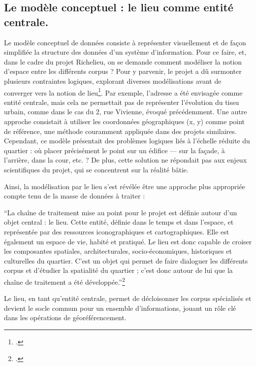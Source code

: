 \subsection{Le modèle conceptuel : le lieu comme entité centrale.}

Le modèle conceptuel de données consiste à représenter visuellement et de façon simplifiée la structure des données d'un système d'information. Pour ce faire, et, dans le cadre du projet Richelieu, on se demande comment modéliser la notion d'espace entre les différents corpus ? Pour y parvenir, le projet a dû surmonter plusieurs contraintes logiques, explorant diverses modélisations avant de converger vers la notion de lieu\footcite{KERVEGANmarque2023}. Par exemple, l'adresse a été envisagée comme entité centrale, mais cela ne permettait pas de représenter l'évolution du tissu urbain, comme dans le cas du 2, rue Vivienne, évoqué précédemment. Une autre approche consistait à utiliser les coordonnées géographiques (x, y) comme point de référence, une méthode couramment appliquée dans des projets similaires. Cependant, ce modèle présentait des problèmes logiques liés à l'échelle réduite du quartier : où placer précisément le point sur un édifice — sur la façade, à l'arrière, dans la cour, etc. ? De plus, cette solution ne répondait pas aux enjeux scientifiques du projet, qui se concentrent sur la réalité bâtie.

Ainsi, la modélisation par le lieu s'est révélée être une approche plus appropriée compte tenu de la masse de données à traiter :
\begin{displayquote}{\enquote{La chaîne de traitement mise au point pour le projet est définie autour d'un objet central : le lieu. Cette entité, définie dans le temps et dans l’espace, et représentée par des ressources iconographiques et cartographiques. Elle est également un espace de vie, habité et pratiqué. Le lieu est donc capable de croiser les composantes spatiales, architecturales, socio-économiques, historiques et culturelles du quartier. C’est un objet qui permet de faire dialoguer les différents corpus et d’étudier la spatialité du quartier ; c’est donc autour de lui que la chaîne de traitement a été développée.}}\footcite{PROJETFondation2023} 
\end{displayquote}

Le lieu, en tant qu'entité centrale, permet de décloisonner les corpus spécialisés et devient le socle commun pour un ensemble d'informations, jouant un rôle clé dans les opérations de géoréférencement. 

